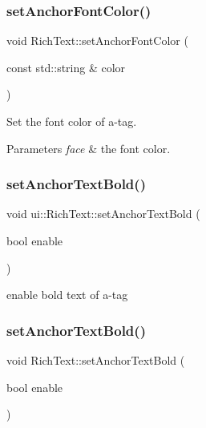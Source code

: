 \subsubsection{\texorpdfstring{set\+Anchor\+Font\+Color()}{setAnchorFontColor()}\hspace{0.1cm}{\footnotesize\ttfamily [2/2]}}
{\footnotesize\ttfamily void Rich\+Text\+::set\+Anchor\+Font\+Color (\begin{DoxyParamCaption}\item[{const std\+::string \&}]{color }\end{DoxyParamCaption})}

Set the font color of a-\/tag. 
\begin{DoxyParams}{Parameters}
{\em face} & the font color. \\
\hline
\end{DoxyParams}
\mbox{\label{classui_1_1RichText_a35bade50d3042d9c5c63ae3d8e61fb78}} 
\subsubsection{\texorpdfstring{set\+Anchor\+Text\+Bold()}{setAnchorTextBold()}\hspace{0.1cm}{\footnotesize\ttfamily [1/2]}}
{\footnotesize\ttfamily void ui\+::\+Rich\+Text\+::set\+Anchor\+Text\+Bold (\begin{DoxyParamCaption}\item[{bool}]{enable }\end{DoxyParamCaption})}

enable bold text of a-\/tag \mbox{\label{classui_1_1RichText_af06a8855abd80bb3685bfa9d73649221}} 
\subsubsection{\texorpdfstring{set\+Anchor\+Text\+Bold()}{setAnchorTextBold()}\hspace{0.1cm}{\footnotesize\ttfamily [2/2]}}
{\footnotesize\ttfamily void Rich\+Text\+::set\+Anchor\+Text\+Bold (\begin{DoxyParamCaption}\item[{bool}]{enable }\end{DoxyParamCaption})}


